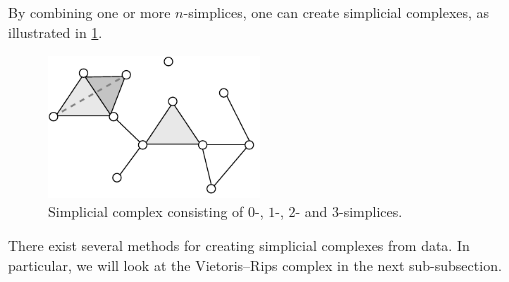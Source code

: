 By combining one or more $n$-simplices, one can create simplicial complexes, as illustrated in \cref{fig:simplicial-complex}.
\begin{figure}[H]
    \centering
    \includegraphics[width=0.5\textwidth]{thesis/figures/simplicial-complex_cropped.pdf}
    \caption{Simplicial complex consisting of $0$-, $1$-, $2$- and $3$-simplices.}
    \label{fig:simplicial-complex}
\end{figure}
There exist several methods for creating simplicial complexes from data. In particular, we will look at the Vietoris–Rips complex in the next sub-subsection.


